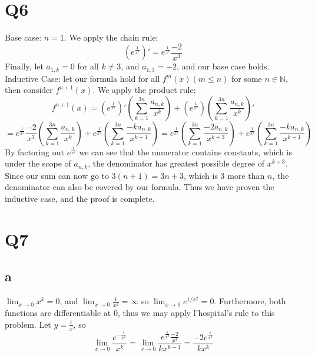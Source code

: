 \documentclass[12pt]{article}
\newcommand{\N}{\mathbb{N}}
\begin{document}
\section{Q6}
Base case: $n=1$. We apply the chain rule:
$$(e^{\frac{1}{x^2}})' = e^{\frac{1}{x^2}}\frac{-2}{x^3}$$
Finally, let $a_{1,k} = 0$ for all $k \not = 3$, and $a_{1,3}=-2$, and our base case holds.
\newline
Inductive Case: let our formula hold for all $f^m(x) (m \leq n)$ for some $n \in \N$, then consider $f^{n+1}(x)$. We apply the product rule:
$$f^{n+1}(x) = (e^{\frac{1}{x^2}})'(\sum_{k=1}^{3n}\frac{a_{n,k}}{x^k}) + (e^{\frac{1}{x^2}})(\sum_{k=1}^{3n}\frac{a_{n,k}}{x^k})'$$
$$= e^{\frac{1}{x^2}}\frac{-2}{x^3}(\sum_{k=1}^{3n}\frac{a_{n,k}}{x^k}) + e^{\frac{1}{x^2}}(\sum_{k=1}^{3n}\frac{-ka_{n,k}}{x^{k+1}})
= e^{\frac{1}{x^2}}(\sum_{k=1}^{3n}\frac{-2a_{n,k}}{x^{k+3}}) + e^{\frac{1}{x^2}}(\sum_{k=1}^{3n}\frac{-ka_{n,k}}{x^{k+1}})$$
By factoring out $e^{\frac{1}{x^2}}$ we can see that the numerator contains constants, which is under the scope of $a_{n,k}$, the denominator has greatest possible degree of $x^{k+3}$. Since our sum can now go to $3(n+1) = 3n+3$, which is $3$ more than $n$, the denominator can also be covered by our formula.
\newline
Thus we have proven the inductive case, and the proof is complete.
\newpage


\section{Q7}
\subsection{a}
$\lim_{x \to 0} x^k = 0$, and $\lim_{x \to 0} \frac{1}{x^2} = \infty$ so $\lim_{x \to 0} e^{1/x^2} = 0$. Furthermore, both functions are differentiable at $0$, thus we may apply l'hospital's rule to this problem. Let $y = \frac{1}{x}$, so
$$\lim_{x \to 0} \frac{e^{-\frac{1}{x^2}}}{x^k} = \lim_{x \to 0} \frac{e^{\frac{1}{x^2}}\frac{-2}{x^3}}{kx^{k-1}} = \frac{-2e^{\frac{1}{x^2}}}{kx^{k}}$$
\end{document}
